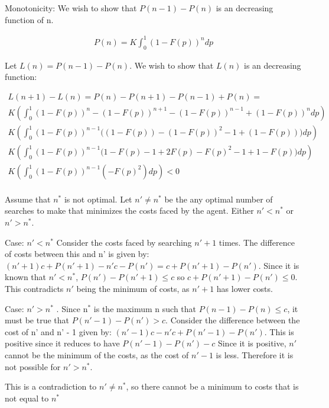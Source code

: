 \documentclass[11pt]{article}
\begin{document}
Monotonicity: We wish to show that $P(n-1) - P(n)$ is an decreasing
function of n. 

\begin{align*}
P(n) = K \int_0^1( 1- F(p))^n dp
\end{align*}

Let $L(n) = P(n-1) - P(n)$. We wish to show that $L(n)$ is an
decreasing function:

\begin{align*}
L(n+1) - L(n) = 
P(n) - P(n+1) - P(n-1) + P(n) = \\
K \left ( \int_0^1 (1-F(p))^n - (1-F(p))^{n+1} - (1-F(p))^{n-1} + (1-F(p))^n dp \right )\\
K \left ( \int_0^1 (1-F(p))^{n-1} \big ( (1-F(p)) - (1-F(p))^2 - 1 + (1-F(p)) \big ) dp
\right )\\
K \left ( \int_0^1 (1-F(p))^{n-1} \big ( 1 - F(p) - 1 + 2F(p) - F(p)^2 - 1 + 1 - F(p)
\big ) dp \right )\\
K \left ( \int_0^1 (1-F(p))^{n-1} ( -F(p)^2 ) dp \right ) < 0\\
\end{align*}


Assume that $n^*$ is not optimal. Let $n' \neq n^*$ be the any optimal
number of searches to make that minimizes the costs faced by the
agent. Either $n' < n^*$ or $n' > n^*$.

Case: $n' < n^*$ Consider the costs faced by searching $n' + 1$
times. The difference of costs between this and n' is given by: $(n' +
1)c + P(n' + 1 ) - n' c - P(n' ) = c + P(n' + 1) - P(n')$. Since it is
known that $n' < n^*$, $P(n' ) - P(n' + 1) \leq c$ so $c + P(n' + 1) -
P(n') \leq 0$. This contradicts $n'$ being the minimum of costs, as $n' +
1$ has lower costs.

Case: $n' > n^*$ .  Since n$^{\text{*}}$ is the maximum n such that $P(n-1) - P(n)
\leq c$, it must be true that $P(n'-1) - P(n') > c$.  Consider the
difference between the cost of n' and n' - 1 given by: $(n' -1)c - n'
c + P(n' - 1) - P(n')$. This is positive since it reduces to have
$P(n'-1) - P(n') - c$ Since it is positive, $n'$ cannot be the minimum
of the costs, as the cost of $n' - 1$ is less.  Therefore it is not
possible for $n' > n^*$.

This is a contradiction to $n' \neq n^*$, so there cannot be a minimum to
costs that is not equal to $n^*$
\end{document}
